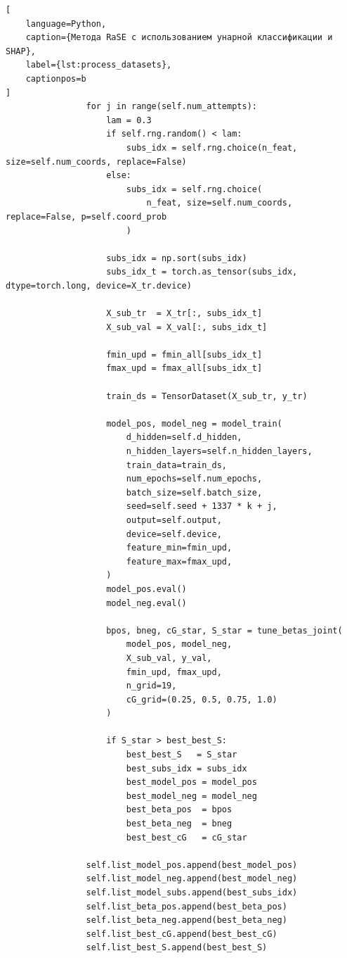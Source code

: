 \documentclass[12pt,a4paper]{article}
\begin{document}
\begin{lstlisting}[
    language=Python,
    caption={Метода RaSE с использованием унарной классификации и SHAP},
    label={lst:process_datasets},
    captionpos=b
]
                for j in range(self.num_attempts):
                    lam = 0.3
                    if self.rng.random() < lam:
                        subs_idx = self.rng.choice(n_feat, size=self.num_coords, replace=False)
                    else:
                        subs_idx = self.rng.choice(
                            n_feat, size=self.num_coords, replace=False, p=self.coord_prob
                        )

                    subs_idx = np.sort(subs_idx)
                    subs_idx_t = torch.as_tensor(subs_idx, dtype=torch.long, device=X_tr.device)

                    X_sub_tr  = X_tr[:, subs_idx_t]
                    X_sub_val = X_val[:, subs_idx_t]

                    fmin_upd = fmin_all[subs_idx_t]
                    fmax_upd = fmax_all[subs_idx_t]

                    train_ds = TensorDataset(X_sub_tr, y_tr)

                    model_pos, model_neg = model_train(
                        d_hidden=self.d_hidden,
                        n_hidden_layers=self.n_hidden_layers,
                        train_data=train_ds,
                        num_epochs=self.num_epochs,
                        batch_size=self.batch_size,
                        seed=self.seed + 1337 * k + j,
                        output=self.output,
                        device=self.device,
                        feature_min=fmin_upd,
                        feature_max=fmax_upd,
                    )
                    model_pos.eval()
                    model_neg.eval()

                    bpos, bneg, cG_star, S_star = tune_betas_joint(
                        model_pos, model_neg,
                        X_sub_val, y_val,
                        fmin_upd, fmax_upd,
                        n_grid=19,
                        cG_grid=(0.25, 0.5, 0.75, 1.0)
                    )

                    if S_star > best_best_S:
                        best_best_S   = S_star
                        best_subs_idx = subs_idx
                        best_model_pos = model_pos
                        best_model_neg = model_neg
                        best_beta_pos  = bpos
                        best_beta_neg  = bneg
                        best_best_cG   = cG_star

                self.list_model_pos.append(best_model_pos)
                self.list_model_neg.append(best_model_neg)
                self.list_model_subs.append(best_subs_idx)
                self.list_beta_pos.append(best_beta_pos)
                self.list_beta_neg.append(best_beta_neg)
                self.list_best_cG.append(best_best_cG)
                self.list_best_S.append(best_best_S)


\end{lstlisting}
\end{document}
